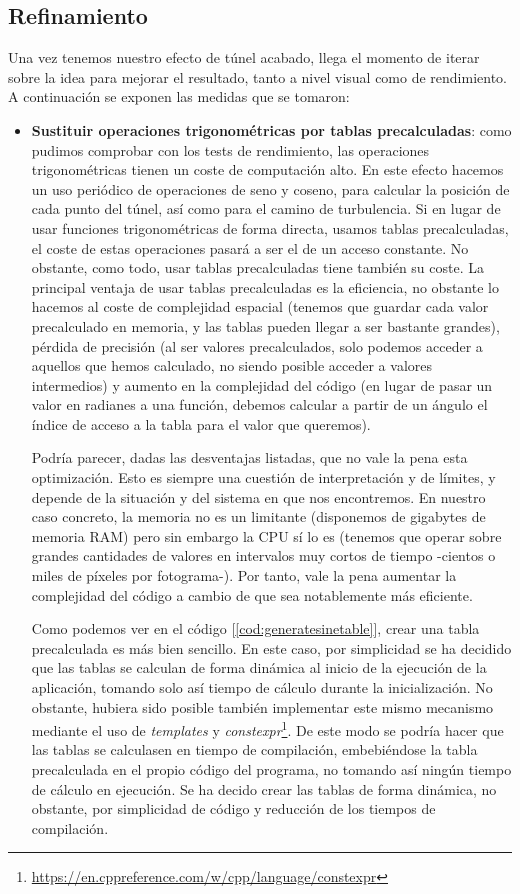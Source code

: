 \subsection{Refinamiento}

Una vez tenemos nuestro efecto de túnel acabado, llega el momento de iterar sobre la idea para mejorar el resultado, tanto a nivel visual como de rendimiento. A continuación se exponen las medidas que se tomaron:

\begin{itemize}
	\item \textbf{Sustituir operaciones trigonométricas por tablas precalculadas}: como pudimos comprobar con los tests de rendimiento, las operaciones trigonométricas tienen un coste de computación alto. En este efecto hacemos un uso periódico de operaciones de seno y coseno, para calcular la posición de cada punto del túnel, así como para el camino de turbulencia. Si en lugar de usar funciones trigonométricas de forma directa, usamos tablas precalculadas, el coste de estas operaciones pasará a ser el de un acceso constante. No obstante, como todo, usar tablas precalculadas tiene también su coste. La principal ventaja de usar tablas precalculadas es la eficiencia, no obstante lo hacemos al coste de complejidad espacial (tenemos que guardar cada valor precalculado en memoria, y las tablas pueden llegar a ser bastante grandes), pérdida de precisión (al ser valores precalculados, solo podemos acceder a aquellos que hemos calculado, no siendo posible acceder a valores intermedios) y aumento en la complejidad del código (en lugar de pasar un valor en radianes a una función, debemos calcular a partir de un ángulo el índice de acceso a la tabla para el valor que queremos).
	
	Podría parecer, dadas las desventajas listadas, que no vale la pena esta optimización. Esto es siempre una cuestión de interpretación y de límites, y depende de la situación y del sistema en que nos encontremos. En nuestro caso concreto, la memoria no es un limitante (disponemos de gigabytes de memoria RAM) pero sin embargo la CPU sí lo es (tenemos que operar sobre grandes cantidades de valores en intervalos muy cortos de tiempo -cientos o miles de píxeles por fotograma-). Por tanto, vale la pena aumentar la complejidad del código a cambio de que sea notablemente más eficiente.
	
	Como podemos ver en el código [\ref{cod:generatesinetable}], crear una tabla precalculada es más bien sencillo. En este caso, por simplicidad se ha decidido que las tablas se calculan de forma dinámica al inicio de la ejecución de la aplicación, tomando solo así tiempo de cálculo durante la inicialización. No obstante, hubiera sido posible también implementar este mismo mecanismo mediante el uso de \emph{templates} y \emph{constexpr}\footnote{\url{https://en.cppreference.com/w/cpp/language/constexpr}}. De este modo se podría hacer que las tablas se calculasen en tiempo de compilación, embebiéndose la tabla precalculada en el propio código del programa, no tomando así ningún tiempo de cálculo en ejecución. Se ha decido crear las tablas de forma dinámica, no obstante, por simplicidad de código y reducción de los tiempos de compilación.
	

\end{itemize}

